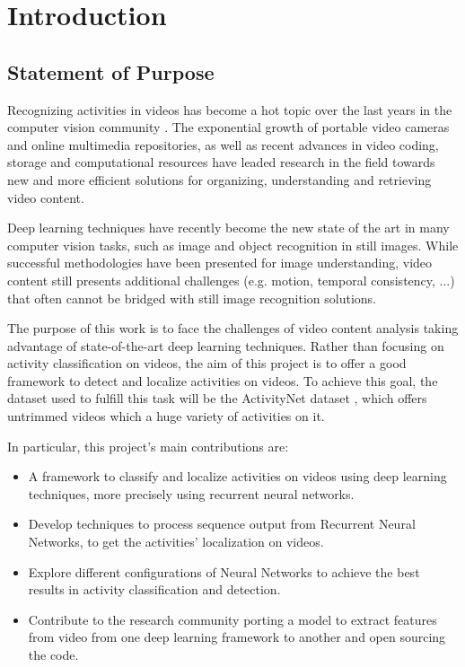\chapter{Introduction}

\section{Statement of Purpose}

Recognizing activities in videos has become a hot topic over the last years in the computer vision community \cite{}. The exponential growth of portable video cameras and online multimedia repositories, as well as recent advances in video coding, storage and computational resources have leaded research in the field towards new and more efficient solutions for organizing, understanding and retrieving video content.

Deep learning techniques have recently become the new state of the art in many computer vision tasks, such as image and object recognition in still images. While successful methodologies have been presented for image understanding, video content still presents additional challenges (e.g. motion, temporal consistency, ...)  that often cannot be bridged with still image recognition solutions.  

The purpose of this work is to face the challenges of video content analysis taking advantage of state-of-the-art deep learning techniques. Rather than focusing on activity classification on videos, the aim of this project is to offer a good framework to detect and localize activities on videos. To achieve this goal, the dataset used to fulfill this task will be the ActivityNet dataset \cite{caba2015activitynet}, which offers untrimmed videos which a huge variety of activities on it.


In particular, this project's main contributions are:
\begin{itemize}
    \item A framework to classify and localize activities on videos using deep learning techniques, more precisely using recurrent neural networks.
    \item Develop techniques to process sequence output from Recurrent Neural Networks, to get the activities' localization on videos.
    \item Explore different configurations of Neural Networks to achieve the best results in activity classification and detection.
    \item Contribute to the research community porting a model to extract features from video from one deep learning framework to another and open sourcing the code.
\end{itemize}

